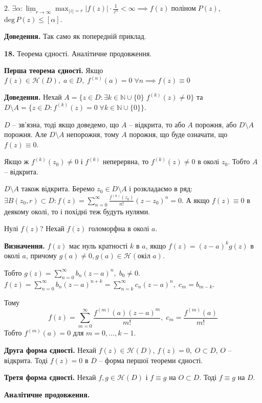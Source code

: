 \documentclass[14pt]{extarticle}
\begin{document}
2. $\exists \alpha: \underline{\lim}_{r \to \infty}\max_{|z|=r}|f(z)| \cdot \frac{1}{z^{\alpha}}<\infty \implies f(z) \; \text{поліном} \; P(z)$, $\text{deg}\, P(z) \leq [\alpha]$. 

\textbf{Доведення.} Так само як попередній приклад.

\textbf{18.} Теорема єдності. Аналітичне продовження.

\textbf{Перша теорема єдності.} Якщо $f(z) \in \mathcal{H}(D), \; a \in D, \; f^{(n)}(a)=0 \; \forall n \implies f(z) \equiv 0$

\textbf{Доведення.} Нехай $A = \{z \in D: \exists k \in \mathbb{N} \cup \{0\} \; f^{(k)}(z) \neq 0\}$ та $D \setminus A = \{z \in D: f^{(k)}(z) = 0 \; \forall k \in \mathbb{N} \cup \{0\}\}$.  

$D$ -- зв'язна, тоді якщо доведемо, що $A$ -- відкрита, то або $A$ порожня, або $D \setminus A$ порожня. Але $D \setminus A$ непорожня, тому $A$ порожня, що буде означати, що $f(z) \equiv 0$.  

Якщо ж $f^{(k)}(z_0) \neq 0$ і $f^{(k)}$ неперервна, то $f^{(k)}(z) \neq 0$ в околі $z_0$. Тобто $A$ -- відкрита. 

$D \setminus A$ також відкрита. Беремо $z_0 \in D \setminus A$ і розкладаємо в ряд: $\exists B(z_0,r) \subset D: f(z) = \sum_{n=0}^{\infty} \frac{f^{(n)}(z_0)}{n!}(z-z_0)^n = 0$. А якщо $f(z) \equiv 0$ в деякому околі, то і похідні теж будуть нулями. 

Нулі $f(z)$? Нехай $f(z)$ голоморфна в околі $a$. 

\textbf{Визначення.} $f(z)$ має нуль кратності $k$ в $a$, якщо $f(z)=(z-a)^kg(z)$ в околі $a$, причому $g(a) \neq 0,g(a) \in \mathcal{H}(\text{окіл $a$})$.  

Тобто $g(z) = \sum_{n=0}^{\infty}b_n(z-a)^n, \; b_0 \neq 0$. $f(z) = \sum_{n=0}^{\infty}b_n(z-a)^{n+k}=\sum_{n=k}^{\infty}c_n(z-a)^n, \; c_m=b_{m-k}$. 

Тому
\[
f(z) = \sum_{m=0}^{\infty} \frac{f^{(m)}(a)(z-a)^m}{m!}, \; c_m = \frac{f^{(m)}(a)}{m!}
\]
Тобто $f^{(m)}(a)=0$ для $m=0,\dots,k-1$. 

\textbf{Друга форма єдності.} Нехай $f(z) \in \mathcal{H}(D)$, $f(z)=0, \; O \subset D$, $O$ -- відкрита. Тоді $f(z)=0$ в $D$ -- форма першої теореми єдності.

\textbf{Третя форма єдності.} Нехай $f,g \in \mathcal{H}(D)$ і $f \equiv g$ на $O \subset D$. Тоді $f \equiv g$ на $D$.

\textbf{Аналітичне продовження.} 
\end{document}
